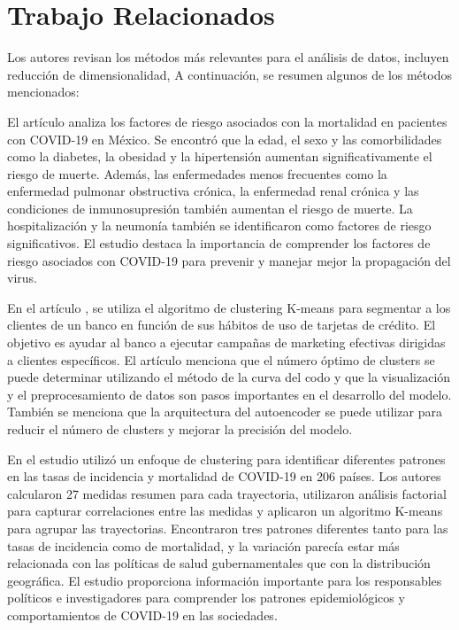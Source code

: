 \documentclass[a4paper,
               ]{jacow}
\begin{document}
\section{Trabajo Relacionados}
 Los autores revisan los métodos más relevantes para el análisis de datos, incluyen reducción de dimensionalidad,  A continuación, se resumen algunos de los métodos mencionados:

 El artículo \cite{Parra2020} analiza los factores de riesgo asociados con la mortalidad en pacientes con COVID-19 en México. Se encontró que la edad, el sexo y las comorbilidades como la diabetes, la obesidad y la hipertensión aumentan significativamente el riesgo de muerte. Además, las enfermedades menos frecuentes como la enfermedad pulmonar obstructiva crónica, la enfermedad renal crónica y las condiciones de inmunosupresión también aumentan el riesgo de muerte. La hospitalización y la neumonía también se identificaron como factores de riesgo significativos. El estudio destaca la importancia de comprender los factores de riesgo asociados con COVID-19 para prevenir y manejar mejor la propagación del virus.

 En el artículo \cite{Dash2022}, se utiliza el algoritmo de clustering K-means para segmentar a los clientes de un banco en función de sus hábitos de uso de tarjetas de crédito. El objetivo es ayudar al banco a ejecutar campañas de marketing efectivas dirigidas a clientes específicos. El artículo menciona que el número óptimo de clusters se puede determinar utilizando el método de la curva del codo y que la visualización y el preprocesamiento de datos son pasos importantes en el desarrollo del modelo. También se menciona que la arquitectura del autoencoder se puede utilizar para reducir el número de clusters y mejorar la precisión del modelo.


En el estudio \cite{Gohari2022} utilizó un enfoque de clustering para identificar diferentes patrones en las tasas de incidencia y mortalidad de COVID-19 en 206 países. Los autores calcularon 27 medidas resumen para cada trayectoria, utilizaron análisis factorial para capturar correlaciones entre las medidas y aplicaron un algoritmo K-means para agrupar las trayectorias. Encontraron tres patrones diferentes tanto para las tasas de incidencia como de mortalidad, y la variación parecía estar más relacionada con las políticas de salud gubernamentales que con la distribución geográfica. El estudio proporciona información importante para los responsables políticos e investigadores para comprender los patrones epidemiológicos y comportamientos de COVID-19 en las sociedades.
\end{document}
